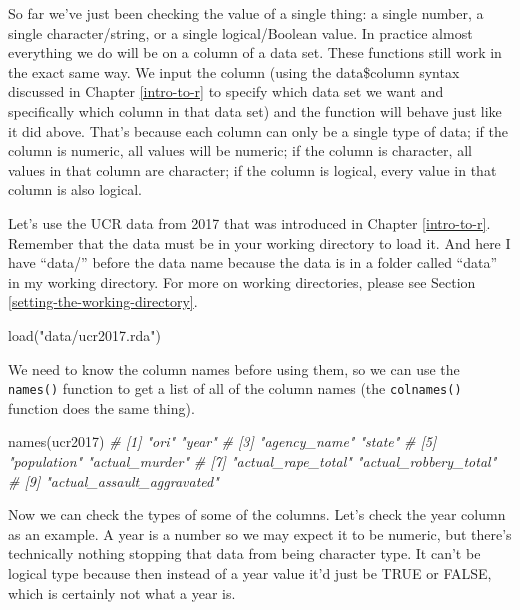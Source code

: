 \documentclass[
]{krantz}
\makeatletter
\newenvironment{Shaded}{\begin{snugshade}}{\end{snugshade}}
\newcommand{\CommentTok}[1]{\textcolor[rgb]{0.37,0.37,0.37}{\textit{#1}}}
\newcommand{\FunctionTok}[1]{\textcolor[rgb]{0,0,0}{#1}}
\newcommand{\NormalTok}[1]{#1}
\newcommand{\StringTok}[1]{\textcolor[rgb]{0.5,0.5,0.5}{#1}}
\newenvironment{kframe}{%
\medskip{}
\setlength{\fboxsep}{.8em}
 \def\at@end@of@kframe{}%
 \ifinner\ifhmode%
  \def\at@end@of@kframe{\end{minipage}}%
  \begin{minipage}{\columnwidth}%
 \fi\fi%
 \def\FrameCommand##1{\hskip\@totalleftmargin \hskip-\fboxsep
 \colorbox{shadecolor}{##1}\hskip-\fboxsep
     \hskip-\linewidth \hskip-\@totalleftmargin \hskip\columnwidth}%
 \MakeFramed {\advance\hsize-\width
   \@totalleftmargin\z@ \linewidth\hsize
   \@setminipage}}%
 {\par\unskip\endMakeFramed%
 \at@end@of@kframe}
\renewenvironment{Shaded}{\begin{kframe}}{\end{kframe}}
\makeatother
\begin{document}
So far we've just been checking the value of a single thing:
a single number, a single character/string, or a single
logical/Boolean value. In practice almost everything we do
will be on a column of a data set. These functions still
work in the exact same way. We input the column (using the
data\$column syntax discussed in Chapter \ref{intro-to-r} to
specify which data set we want and specifically which column
in that data set) and the function will behave just like it
did above. That's because each column can only be a single
type of data; if the column is numeric, all values will be
numeric; if the column is character, all values in that
column are character; if the column is logical, every value
in that column is also logical.

Let's use the UCR data from 2017 that was introduced in
Chapter \ref{intro-to-r}. Remember that the data must be in
your working directory to load it. And here I have ``data/''
before the data name because the data is in a folder called
``data'' in my working directory. For more on working
directories, please see Section
\ref{setting-the-working-directory}.

\begin{Shaded}
\begin{Highlighting}[]
\FunctionTok{load}\NormalTok{(}\StringTok{"data/ucr2017.rda"}\NormalTok{)}
\end{Highlighting}
\end{Shaded}

We need to know the column names before using them, so we
can use the \texttt{names()} function to get a list of all
of the column names (the \texttt{colnames()} function does
the same thing).

\begin{Shaded}
\begin{Highlighting}[]
\FunctionTok{names}\NormalTok{(ucr2017)}
\CommentTok{\# [1] "ori"                       "year"                     }
\CommentTok{\# [3] "agency\_name"               "state"                    }
\CommentTok{\# [5] "population"                "actual\_murder"            }
\CommentTok{\# [7] "actual\_rape\_total"         "actual\_robbery\_total"     }
\CommentTok{\# [9] "actual\_assault\_aggravated"}
\end{Highlighting}
\end{Shaded}

Now we can check the types of some of the columns. Let's
check the year column as an example. A year is a number so
we may expect it to be numeric, but there's technically
nothing stopping that data from being character type. It
can't be logical type because then instead of a year value
it'd just be TRUE or FALSE, which is certainly not what a
year is.
\end{document}
